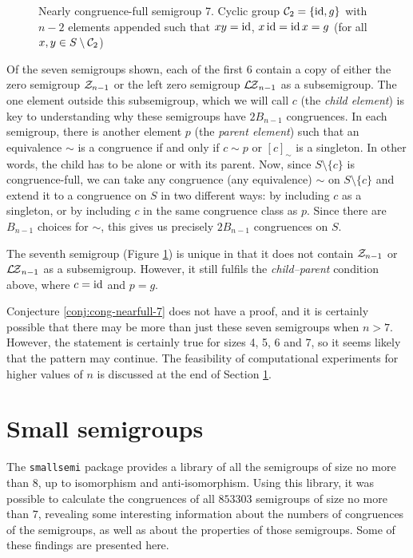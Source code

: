 \begin{figure}[p]
  \centering
  
  \caption[Nearly congruence-full semigroup 7]{Nearly congruence-full semigroup
    7.  Cyclic group $\mathcal{C}_2 = \{\operatorname{id}, g\}$ with $n-2$ elements appended such
    that $xy=\operatorname{id}$, $x \operatorname{id}=\operatorname{id} x=g$ (for all $x,y \in S \setminus \mathcal{C}_2$)}
  \label{fig:nearfull-7}
\end{figure}

Of the seven semigroups shown, each of the first 6 contain a copy of either the zero
semigroup $\mathcal{Z}_{n-1}$ or the left zero semigroup $\mathcal{L\!Z}_{n-1}$ as a subsemigroup.
The one element outside this subsemigroup, which we will call $c$ (the
\textit{child element}) is key to understanding why these semigroups have
$2B_{n-1}$ congruences.  In each semigroup, there is another element $p$ (the
\textit{parent element}) such that an equivalence $\sim$ is a congruence if and
only if $c \sim p$ or $[c]_\sim$ is a singleton.  In other words, the child has
to be alone or with its parent.  Now, since $S \setminus \{c\}$ is
congruence-full, we can take any congruence (any equivalence) $\sim$ on
$S \setminus \{c\}$ and extend it to a congruence on $S$ in two different ways:
by including $c$ as a singleton, or by including $c$ in the same congruence
class as $p$.  Since there are $B_{n-1}$ choices for $\sim$, this gives us
precisely $2B_{n-1}$ congruences on $S$.

The seventh semigroup (Figure \ref{fig:nearfull-7}) is unique in that it does
not contain $\mathcal{Z}_{n-1}$ or $\mathcal{L\!Z}_{n-1}$ as a subsemigroup.  However, it still
fulfils the \textit{child--parent} condition above, where $c = \operatorname{id}$ and $p = g$.

Conjecture \ref{conj:cong-nearfull-7} does not have a proof, and it is certainly
possible that there may be more than just these seven semigroups when $n > 7$.
However, the statement is certainly true for sizes 4, 5, 6 and 7, so it seems
likely that the pattern may continue.  The feasibility of computational
experiments for higher values of $n$ is discussed at the end of Section
\ref{sec:smallsemi}.

\section{Small semigroups}
\label{sec:smallsemi}
The \texttt{smallsemi} package \cite{smallsemi} provides a library of all the
semigroups of size no more than $8$, up to isomorphism and anti-isomorphism.
Using this library, it was possible to calculate the congruences of all
$853303$ semigroups of size no more than $7$, revealing some interesting
information about the numbers of congruences of the semigroups, as well as about
the properties of those semigroups.  Some of these findings are presented here.

